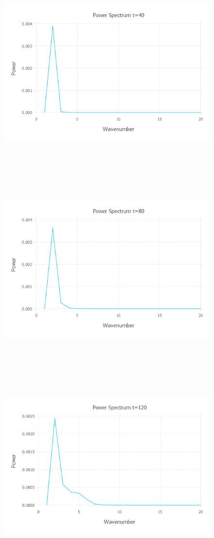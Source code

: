 \documentclass{article}
\begin{document}
\begin{figure}[H]
	\includegraphics[width=6in,height=4in]{"q4_ps_40"}
\end{figure}
\begin{figure}[H]
	\includegraphics[width=6in,height=4in]{"q4_ps_80"}
\end{figure}
\begin{figure}[H]
	\includegraphics[width=6in,height=4in]{"q4_ps_120"}
\end{figure}
\end{document}
